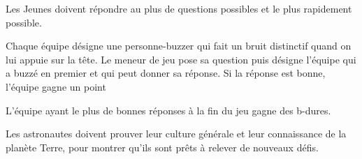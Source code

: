 \documentclass{grand-jeu}
\begin{document}
\begin{liste-materiel}
\end{liste-materiel}

\begin{regles}
Les Jeunes doivent répondre au plus de questions possibles et le plus rapidement possible. 

Chaque équipe désigne une personne-buzzer qui fait un bruit distinctif quand on lui appuie sur la tête.
Le meneur de jeu pose sa question puis désigne l'équipe qui a buzzé en premier et qui peut donner sa réponse. Si la réponse est bonne, l'équipe gagne un point

L'équipe ayant le plus de bonnes réponses à la fin du jeu gagne des b-dures. 
\end{regles}

\begin{imaginaire}
Les astronautes doivent prouver leur culture générale et leur connaissance de la planète Terre, pour montrer qu'ils sont prêts à relever de nouveaux défis. 
\end{imaginaire}

\begin{moments-stop}
\end{moments-stop}
\end{document}
